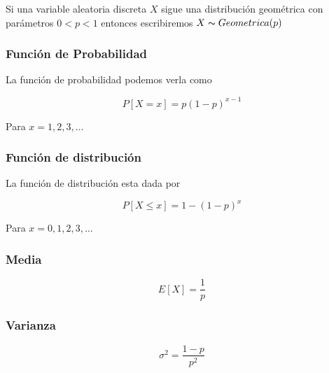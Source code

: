 \documentclass{article}
\begin{document}
\begin{multicols}{2}
            Si una variable aleatoria discreta $X$ sigue una distribución geométrica con parámetros $0<p<1$ entonces escribiremos $X\thicksim Geometrica (p)$ 

                 \subsubsection{Función de Probabilidad}

                    La función de probabilidad podemos verla como

                        \begin{equation*}
                            P[X=x]=p(1-p)^{x-1}
                        \end{equation*}

                    Para $x=1,2,3,\ldots$

                \subsubsection{Función de distribución }

                    La función de distribución esta dada por

                        \begin{equation*}
                            P[X\leq x]  = 1-(1-p)^x
                        \end{equation*}

                    Para $x=0,1,2,3,\ldots $

                \subsubsection{Media}

                            \begin{equation*}
                                E[X] = \frac{1}{p}
                            \end{equation*}
                
                \subsubsection{Varianza}

                    \begin{equation*}
                        \sigma ^2 = \frac{1-p}{p^2}
                    \end{equation*}
                    

\end{multicols}
\end{document}
